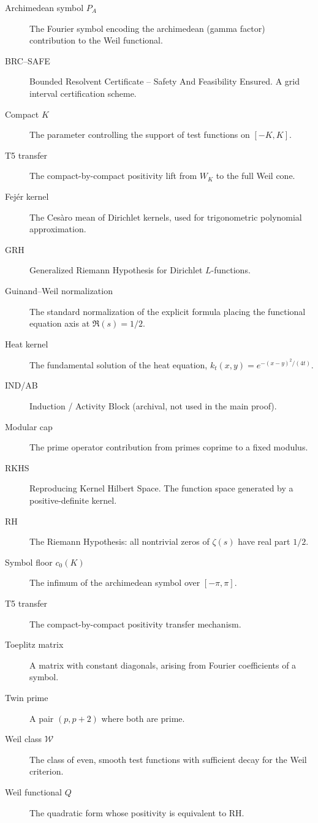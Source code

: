 \begin{description}
  \item[Archimedean symbol $P_A$] The Fourier symbol encoding the archimedean (gamma factor) contribution to the Weil functional.

  \item[BRC--SAFE] Bounded Resolvent Certificate -- Safety And Feasibility Ensured. A grid interval certification scheme.

  \item[Compact $K$] The parameter controlling the support of test functions on $[-K, K]$.

  \item[T5 transfer] The compact-by-compact positivity lift from $W_K$ to the full Weil cone.

  \item[Fej\'er kernel] The Ces\`aro mean of Dirichlet kernels, used for trigonometric polynomial approximation.

  \item[GRH] Generalized Riemann Hypothesis for Dirichlet $L$-functions.

  \item[Guinand--Weil normalization] The standard normalization of the explicit formula placing the functional equation axis at $\Re(s) = 1/2$.

  \item[Heat kernel] The fundamental solution of the heat equation, $k_t(x,y) = e^{-(x-y)^2/(4t)}$.

  \item[IND/AB] Induction / Activity Block (archival, not used in the main proof).

  \item[Modular cap] The prime operator contribution from primes coprime to a fixed modulus.

  \item[RKHS] Reproducing Kernel Hilbert Space. The function space generated by a positive-definite kernel.

  \item[RH] The Riemann Hypothesis: all nontrivial zeros of $\zeta(s)$ have real part $1/2$.

  \item[Symbol floor $c_0(K)$] The infimum of the archimedean symbol over $[-\pi, \pi]$.

  \item[T5 transfer] The compact-by-compact positivity transfer mechanism.

  \item[Toeplitz matrix] A matrix with constant diagonals, arising from Fourier coefficients of a symbol.

  \item[Twin prime] A pair $(p, p+2)$ where both are prime.

  \item[Weil class $\mathcal{W}$] The class of even, smooth test functions with sufficient decay for the Weil criterion.

  \item[Weil functional $Q$] The quadratic form whose positivity is equivalent to RH.
\end{description}







